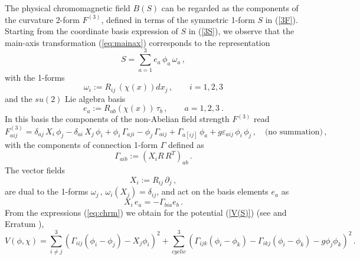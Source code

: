 \documentclass[a4paper,12pt]{article}
\begin{document}
The physical chromomagnetic field $B(S)$ can be regarded
as the components of the curvature 2-form $F^{(3)}$, defined
in terms of the symmetric 1-form $S$ in (\ref{3F}).
Starting from the coordinate basis expression of $S$ in (\ref{3S}),
we observe that the main-axis transformation (\ref{eq:mainax}) corresponds to
the representation
\begin{equation}
\label{eq:sof}
S =\sum_{a=1}^3 e_a\,\phi_{a} \,\omega_a \,,
\end{equation}
with the 1-forms
\begin{equation}
\omega_i := R_{ij}\, (\chi(x))dx_j \,, \qquad i = 1,2,3
\end{equation}
and the $su(2)$ Lie algebra basis
\begin{equation}
e_a := R_{ab}(\chi(x))\, \tau_b\,, \qquad a = 1,2,3~.
\end{equation}
In this basis the components of the non-Abelian field strength $F^{(3)}$ read
\begin{equation}
\label{eq:chrm}
F^{(3)}_{aij} =
\delta_{aj}\, X_i\, \phi_j - \delta_{ai}\, X_j\, \phi_i +
\phi_i\, \Gamma_{aji} - \phi_j \, \Gamma_{aij} +
\Gamma_{a[ij]}\, \phi_a +
g\varepsilon_{aij}\, \phi_i \,\phi_j \,,
\quad \mbox{(no summation)}\,,
\end{equation}
with the components of connection 1-form $\Gamma$ defined as
\begin{equation}
\label{Gammaspace}
\Gamma_{aib} := \left(X_i R\, R^T \right)_{ab}\,.
\end{equation}
The vector fields
\begin{equation}
X_i := R_{ij}\,\partial_j \,,
\end{equation}
are dual to the 1-forms $\omega_j\,, \, \omega_i( X_j) = \delta_{ij}$,
and act on the basis elements $e_a$ as
\begin{equation}
X_i \, e_a = - \Gamma_{bia}e_b\,.
\end{equation}
From the expressions (\ref{eq:chrm}) we obtain for the potential (\ref{V(S)})
(see \cite{KP} and Erratum \cite{ErrKP}),
\begin{equation}
\label{Vinhom1}
V(\phi,\chi) = \sum_{i\neq j}^{3}
\left(
\Gamma_{iij} (\phi_i-\phi_j) - X_j \phi_i\right)^2
+ \sum_{cyclic}^3\left(\Gamma_{ijk}(\phi_i-\phi_k) -
\Gamma_{ikj}(\phi_i - \phi_k) - g\phi_j \phi_k\right)^2\,.
\end{equation}
\end{document}
